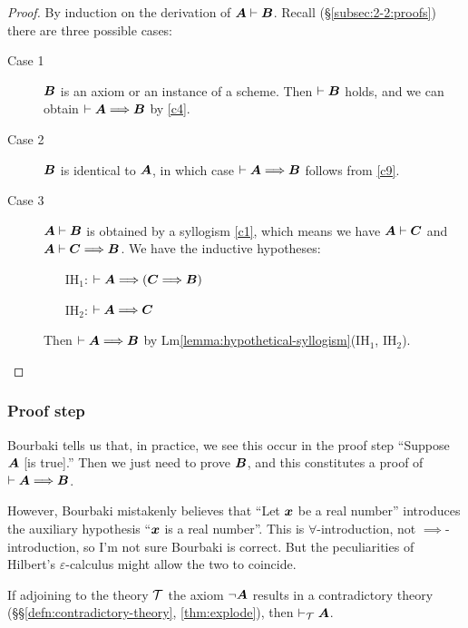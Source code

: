 \begin{proof}
By induction on the derivation of $\boldsymbol{A}\vdash\boldsymbol{B}$.
Recall (\S\ref{subsec:2-2:proofs}) there are three possible cases:
\begin{description}
\item[Case 1] $\boldsymbol{B}$ is an axiom or an instance of a
  scheme. Then $\vdash\boldsymbol{B}$ holds, and we can obtain
  $\vdash\boldsymbol{A}\Longrightarrow\boldsymbol{B}$ by \ref{c4}.
\item[Case 2] $\boldsymbol{B}$ is identical to $\boldsymbol{A}$, in
  which case $\vdash\boldsymbol{A}\Longrightarrow\boldsymbol{B}$ follows
  from \ref{c9}.
\item[Case 3] $\boldsymbol{A}\vdash\boldsymbol{B}$ is obtained by a
  syllogism \ref{c1}, which means we have
  $\boldsymbol{A}\vdash\boldsymbol{C}$ and
  $\boldsymbol{A}\vdash\boldsymbol{C}\Longrightarrow\boldsymbol{B}$. We
  have the inductive hypotheses:
  \begin{itemize}
  \item[IH${}_{1}$:] $\vdash\boldsymbol{A}\Longrightarrow(\boldsymbol{C}\Longrightarrow\boldsymbol{B})$
  \item[IH${}_{2}$:] $\vdash\boldsymbol{A}\Longrightarrow\boldsymbol{C}$
  \end{itemize}
\noindent Then $\vdash\boldsymbol{A}\Longrightarrow\boldsymbol{B}$ by Lm\ref{lemma:hypothetical-syllogism}(IH${}_{1}$, IH${}_{2}$).\qedhere
\end{description}
\end{proof}

\subsubsection{Proof step}
Bourbaki tells us that, in practice, we see this occur in the proof step
``Suppose $\boldsymbol{A}$ [is true].'' Then we just need to prove
$\boldsymbol{B}$, and this constitutes a proof of $\vdash\boldsymbol{A}\Longrightarrow\boldsymbol{B}$.

However, Bourbaki mistakenly believes that ``Let $\boldsymbol{x}$ be a
real number'' introduces the auxiliary hypothesis ``$\boldsymbol{x}$
is a real number''. This is $\forall$-introduction, not
$\implies$-introduction, so I'm not sure Bourbaki is correct. But the
peculiarities of Hilbert's $\varepsilon$-calculus might allow the two to
coincide. 


\begin{dc}\label{c15}
If adjoining to the theory $\mathcal{T}$ the axiom $\neg\boldsymbol{A}$
results in a contradictory theory (\S\S\ref{defn:contradictory-theory}, \ref{thm:explode}),
then $\vdash_{\mathcal{T}}\boldsymbol{A}$.
\end{dc}

